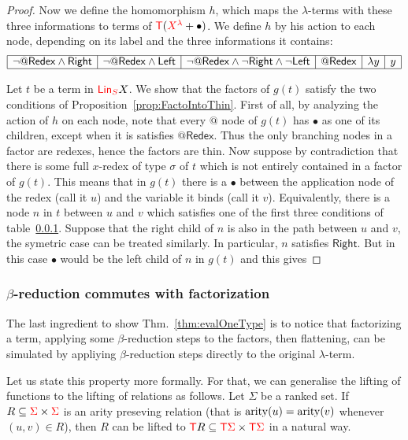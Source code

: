 \begin{proof}
Now we define the homomorphism $h$, which maps the $\lambda$-terms with these three informations to terms of ${\color{red}{\mathsf T}} ({\color{red}{X^\lambda}}+\bullet)$. We define $h$ by his action to each node, depending on its label and the three informations it contains:
$$\begin{array}{|l|l|l|l|l|l|}
\hline
\neg\mathsf{@Redex} \wedge \mathsf{Right} & \neg\mathsf{@Redex} \wedge \mathsf{Left} & \neg\mathsf{@Redex} \wedge \neg\mathsf{Right} \wedge \neg\mathsf{Left} & \mathsf{@Redex} &  \lambda y & y\\
\hline
\end{array}$$

Let $t$ be a term in ${\color{red}{\mathsf{Lin}_{S}}} X$. We show that the factors of $g(t)$ satisfy the two conditions of Proposition~\ref{prop:FactoIntoThin}. First of all, by analyzing the action of $h$ on each node, note that every $@$ node of $g(t)$ has $\bullet$ as one of its children, except when it is satisfies $\mathsf{@Redex}$. Thus the only branching nodes in a factor are redexes, hence the factors are thin. Now suppose by contradiction that there is some full $x$-redex of type $\sigma$ of $t$ which is not entirely contained in a factor of $g(t)$. This means that in $g(t)$ there is a $\bullet$ between the application node of the redex (call it $u$) and the variable it binds (call it $v$). Equivalently, there is a node $n$ in $t$ between $u$ and $v$ which satisfies one of the first three conditions of table~\ref{}.  Suppose that the right child of $n$ is also in the path between $u$ and $v$, the symetric case can be treated similarly. In particular, $n$ satisfies $\mathsf{Right}$. But in this case $\bullet$ would be the left child of $n$ in $g(t)$ and this gives 
\end{proof}
\subsubsection{$\beta$-reduction commutes with factorization} The last ingredient to show Thm.~\ref{thm:evalOneType} is to notice  that factorizing a term, applying some $\beta$-reduction steps to the factors, then flattening, can be simulated by appliying  $\beta$-reduction steps directly to the original $\lambda$-term.

Let us state this property more formally. For that, we can generalise the lifting of functions to the lifting of relations as follows. 
Let $\Sigma$ be a ranked set. If $R\subseteq {\color{red}{\Sigma}}\times{\color{red}{\Sigma}}$ is an arity preseving relation (that is $\mathrm{arity}(u)=\mathrm{arity}(v)$ whenever $(u,v)\in R$), then $R$ can be lifted to ${\color{red}{\mathsf T}} R\subseteq {\color{red}{{\color{red}{\mathsf T}}\Sigma}} \times {\color{red}{{\color{red}{\mathsf T}}\Sigma}}$ in a natural way. 

